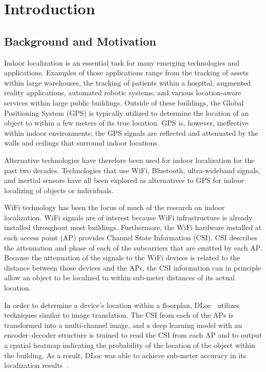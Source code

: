 \chapter{Introduction}
\label{ch:introduction}

\section{Background and Motivation}
\label{sec:intro:background}

Indoor localization is an essential task for many emerging technologies and applications. Examples of
those applications range from the tracking of assets within large warehouses, the tracking of patients
within a hospital, augmented reality applications, automated robotic systems, and various
location-aware services within large public buildings. Outside of these buildings, the Global
Positioning System (GPS) is typically utilized to determine the location of an object to within a few
meters of its true location. GPS is, however, ineffective within indoor environments; the GPS signals
are reflected and attenuated by the walls and ceilings that surround indoor locations.

Alternative technologies have therefore been used for indoor localization for the past two decades.
Technologies that use WiFi, Bluetooth, ultra-wideband signals, and inertial sensors have all been
explored as alternatives to GPS for indoor localizing of objects or individuals.

WiFi technology has been the focus of much of the research on indoor localization. WiFi signals are of
interest because WiFi infrastructure is already installed throughout most buildings. Furthermore, the
WiFi hardware installed at each access point (AP) provides Channel State Information (CSI). CSI
describes the attenuation and phase of each of the subcarriers that are emitted by each AP. Because the
attenuation of the signals to the WiFi devices is related to the distance between those devices and the
APs, the CSI information can in principle allow an object to be localized to within sub-meter distances
of its actual location.

In order to determine a device's location within a floorplan, DLoc~\cite{ayyalasomayajula2020deep}
utilizes techniques similar to image translation. The CSI from each of the APs is transformed into a
multi-channel image, and a deep learning model with an encoder--decoder structure is trained to read
the CSI from each AP and to output a spatial heatmap indicating the probability of the location of the
object within the building. As a result, DLoc was able to achieve sub-meter accuracy in its
localization results~\cite{ayyalasomayajula2020deep}.

